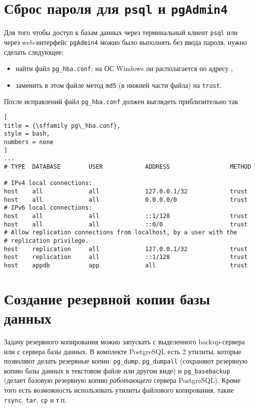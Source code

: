 \documentclass[%
	11pt,
	a4paper,
	utf8,
		]{article}
\begin{document}
\section{Сброс пароля для \texttt{psql} и \texttt{pgAdmin4}}

Для того чтобы доступ к базам данных через терминальный клиент \texttt{psql} или через web-интерфейс \texttt{pgAdmin4} можно было выполнять без ввода пароля, нужно сделать следующее:
\begin{itemize}
	\item найти файл \texttt{pg\_hba.conf}; на ОС Windows он располагается по адресу ,
	
	\item заменить в этом файле метод \texttt{md5} (в нижней части файла) на \texttt{trust}.
\end{itemize}

После исправлений файл \texttt{pg\_hba.conf} должен выглядеть приблизительно так
\begin{lstlisting}[
title = {\sffamily pg\_hba.conf},
style = bash,
numbers = none
]
...
# TYPE  DATABASE        USER            ADDRESS                 METHOD

# IPv4 local connections:
host    all             all             127.0.0.1/32            trust
host    all             all             0.0.0.0/0               trust
# IPv6 local connections:
host    all             all             ::1/128                 trust
host    all             all             ::0/0                   trust
# Allow replication connections from localhost, by a user with the
# replication privilege.
host    replication     all             127.0.0.1/32            trust
host    replication     all             ::1/128                 trust
host    appdb           app             all                     trust

\end{lstlisting}

\section{Создание резервной копии базы данных}

Задачу резервного копирования можно запускать с выделенного backup-сервера или с сервера базы данных. В комплекте PostgreSQL есть 2 утилиты, которые позволяют делать резервные копии: \texttt{pg\_dump}, \texttt{pg\_dumpall} (сохраняют резервную копию базы данных в текстовом файле или другом виде) и \texttt{pg\_basebackup} (делает базовую резервную копию \emph{работающего} сервера PostgreSQL). Кроме того есть возможность использовать утилиты файлового копирования, такие \texttt{rsync}, \texttt{tar}, \texttt{cp} и т.п.
\end{document}
